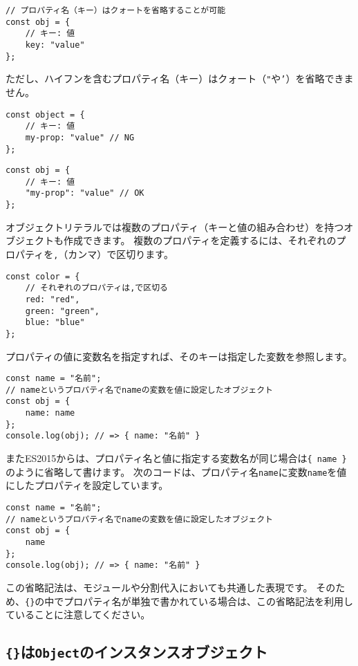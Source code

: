 \begin{lstlisting}
// プロパティ名（キー）はクォートを省略することが可能
const obj = {
    // キー: 値
    key: "value"
};
\end{lstlisting}

ただし、ハイフンを含むプロパティ名（キー）はクォート（\texttt{"}や\texttt{'}）を省略できません。

\begin{lstlisting}
const object = {
    // キー: 値
    my-prop: "value" // NG
};
\end{lstlisting}

\begin{lstlisting}
const obj = {
    // キー: 値
    "my-prop": "value" // OK
};
\end{lstlisting}

オブジェクトリテラルでは複数のプロパティ（キーと値の組み合わせ）を持つオブジェクトも作成できます。
複数のプロパティを定義するには、それぞれのプロパティを\texttt{,}（カンマ）で区切ります。

\begin{lstlisting}
const color = {
    // それぞれのプロパティは,で区切る
    red: "red",
    green: "green",
    blue: "blue"
};
\end{lstlisting}

プロパティの値に変数名を指定すれば、そのキーは指定した変数を参照します。

\begin{lstlisting}
const name = "名前";
// nameというプロパティ名でnameの変数を値に設定したオブジェクト
const obj = {
    name: name
};
console.log(obj); // => { name: "名前" }
\end{lstlisting}

またES2015からは、プロパティ名と値に指定する変数名が同じ場合は\texttt{\{ name \}}のように省略して書けます。
次のコードは、プロパティ名\texttt{name}に変数\texttt{name}を値にしたプロパティを設定しています。

\begin{lstlisting}
const name = "名前";
// nameというプロパティ名でnameの変数を値に設定したオブジェクト
const obj = {
    name
};
console.log(obj); // => { name: "名前" }
\end{lstlisting}

この省略記法は、モジュールや分割代入においても共通した表現です。
そのため、\texttt{\{\}}の中でプロパティ名が単独で書かれている場合は、この省略記法を利用していることに注意してください。

\hypertarget{object-instance-object}{%
\subsection{\texorpdfstring{\texttt{\{\}}は\texttt{Object}のインスタンスオブジェクト}{\{\}はObjectのインスタンスオブジェクト}}\label{object-instance-object}}

